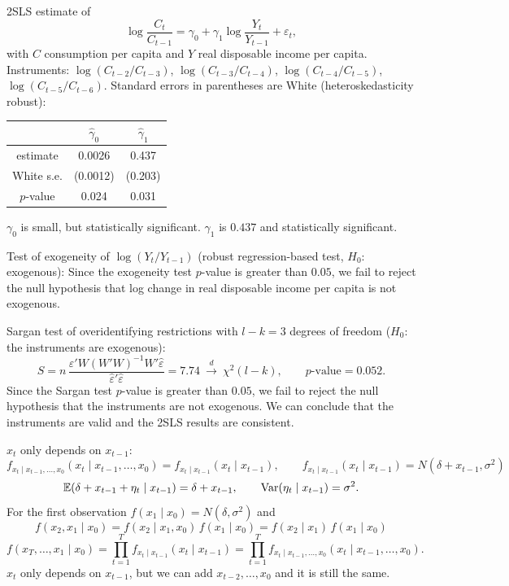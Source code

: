 \documentclass[11pt]{article}
\begin{document}
2SLS estimate of
\[
\log\frac{C_t}{C_{t-1}}=\gamma_0+\gamma_1\log\frac{Y_t}{Y_{t-1}}+\varepsilon_t,
\]
with $C$ consumption per capita and $Y$ real disposable income per capita. Instruments: $\log(C_{t-2}/C_{t-3})$, $\log(C_{t-3}/C_{t-4})$, $\log(C_{t-4}/C_{t-5})$, $\log(C_{t-5}/C_{t-6})$. Standard errors in parentheses are White (heteroskedasticity robust):
\begin{center}
\begin{tabular}{c|cc}
 & $\hat\gamma_0$ & $\hat\gamma_1$\\\hline
estimate & 0.0026 & 0.437\\
White s.e. & (0.0012) & (0.203)\\
$p$-value & 0.024 & 0.031
\end{tabular}
\end{center}
$\gamma_0$ is small, but statistically significant. $\gamma_1$ is $0.437$ and statistically significant.

Test of exogeneity of $\log(Y_t/Y_{t-1})$ (robust regression-based test, $H_0$: exogenous):
Since the exogeneity test $p$-value is greater than $0.05$, we fail to reject the null hypothesis that log change in real disposable income per capita is not exogenous.

Sargan test of overidentifying restrictions with $l-k=3$ degrees of freedom ($H_0$: the instruments are exogenous):
\[
S=n\,\frac{\hat\varepsilon'W(W'W)^{-1}W'\hat\varepsilon}{\hat\varepsilon'\hat\varepsilon}=7.74\ \xrightarrow{d}\ \chi^2(l-k),\qquad p\text{-value}=0.052 .
\]
Since the Sargan test $p$-value is greater than $0.05$, we fail to reject the null hypothesis that the instruments are not exogenous. We can conclude that the instruments are valid and the 2SLS results are consistent.


$x_t$ only depends on $x_{t-1}$:
\[
f_{x_t\mid x_{t-1},\dots,x_0}(x_t\mid x_{t-1},\dots,x_0)=f_{x_t\mid x_{t-1}}(x_t\mid x_{t-1}),
\qquad
f_{x_t\mid x_{t-1}}(x_t\mid x_{t-1})=N(\delta+x_{t-1},\sigma^2)
\]
\[
\mathbb{E}(\delta+x_{t-1}+\eta_t\mid x_{t-1})=\delta+x_{t-1},\qquad\operatorname{Var}(\eta_t\mid x_{t-1})=\sigma^2 .
\]
For the first observation $f(x_1\mid x_0)=N(\delta,\sigma^2)$ and
\[
f(x_2,x_1\mid x_0)=f(x_2\mid x_1,x_0)\,f(x_1\mid x_0)=f(x_2\mid x_1)\,f(x_1\mid x_0)
\]
\[
f(x_T,\dots,x_1\mid x_0)=\prod_{t=1}^Tf_{x_t\mid x_{t-1}}(x_t\mid x_{t-1})=\prod_{t=1}^Tf_{x_t\mid x_{t-1},\dots,x_0}(x_t\mid x_{t-1},\dots,x_0).
\]
$x_t$ only depends on $x_{t-1}$, but we can add $x_{t-2},\dots,x_0$ and it is still the same.
\end{document}
